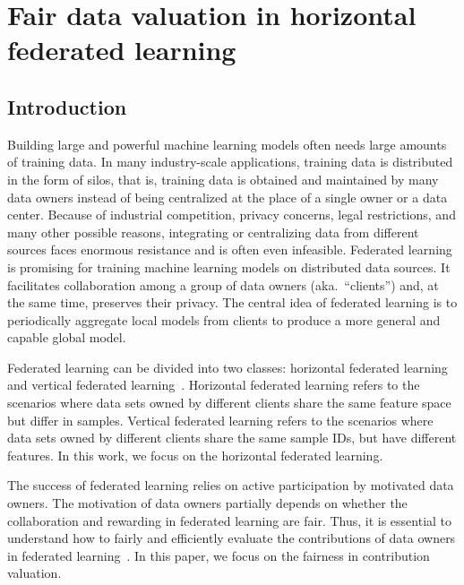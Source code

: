 \chapter{Fair data valuation in horizontal federated learning}
\label{ch:Val-HFL}

\section{Introduction} \label{sec:7.1}

Building large and powerful machine learning models often needs large amounts of training data. In many industry-scale applications, training data is distributed in the form of silos, that is, training data is obtained and maintained by many data owners instead of being centralized at the place of a single owner or a data center. Because of industrial competition, privacy concerns, legal restrictions, and many other possible reasons, integrating or centralizing data from different sources faces enormous resistance and is often even infeasible. Federated learning~\cite{federated2016} is promising for training machine learning models on distributed data sources. It facilitates collaboration among a group of data owners (aka.~``clients'') and, at the same time, preserves their privacy. The central idea of federated learning is to periodically aggregate local models from clients to produce a more general and capable global model.

Federated learning can be divided into two classes: horizontal federated learning and vertical federated learning~\cite{yang2019federated}. Horizontal federated learning refers to the scenarios where data sets owned by different clients share the same feature space but differ in samples. Vertical federated learning refers to the scenarios where data sets owned by different clients share the same sample IDs, but have different features. In this work, we focus on the horizontal federated learning. 

The success of federated learning relies on active participation by motivated data owners. The motivation of data owners partially depends on whether the collaboration and rewarding in federated learning are fair.  Thus, it is essential to understand how to fairly and efficiently evaluate the contributions of data owners in federated learning~\cite{zhang2020hierarchically,song2019profit,wei2020efficient,wang2020principled}. In this paper, we focus on the fairness in contribution valuation.

